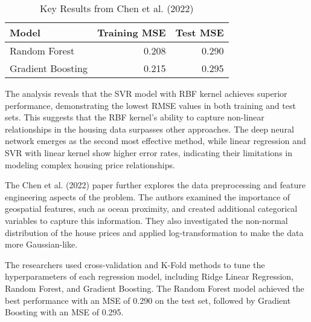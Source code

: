\documentclass[a4paper, 11pt]{article}
\begin{document}
\begin{table}[h]
\centering
\caption{Key Results from Chen et al. (2022)}
\begin{tabular}{@{}p{3.5cm}rr@{}}
\toprule
\textbf{Model} & \textbf{Training MSE} & \textbf{Test MSE} \\
\midrule
Random Forest & 0.208 & 0.290 \\
Gradient Boosting & 0.215 & 0.295 \\
\bottomrule
\end{tabular}
\end{table}

The analysis reveals that the SVR model with RBF kernel achieves superior performance, demonstrating the lowest RMSE values in both training and test sets. This suggests that the RBF kernel's ability to capture non-linear relationships in the housing data surpasses other approaches. The deep neural network emerges as the second most effective method, while linear regression and SVR with linear kernel show higher error rates, indicating their limitations in modeling complex housing price relationships.

The Chen et al. (2022) paper further explores the data preprocessing and feature engineering aspects of the problem. The authors examined the importance of geospatial features, such as ocean proximity, and created additional categorical variables to capture this information. They also investigated the non-normal distribution of the house prices and applied log-transformation to make the data more Gaussian-like.

The researchers used cross-validation and K-Fold methods to tune the hyperparameters of each regression model, including Ridge Linear Regression, Random Forest, and Gradient Boosting. The Random Forest model achieved the best performance with an MSE of 0.290 on the test set, followed by Gradient Boosting with an MSE of 0.295.
\end{document}
